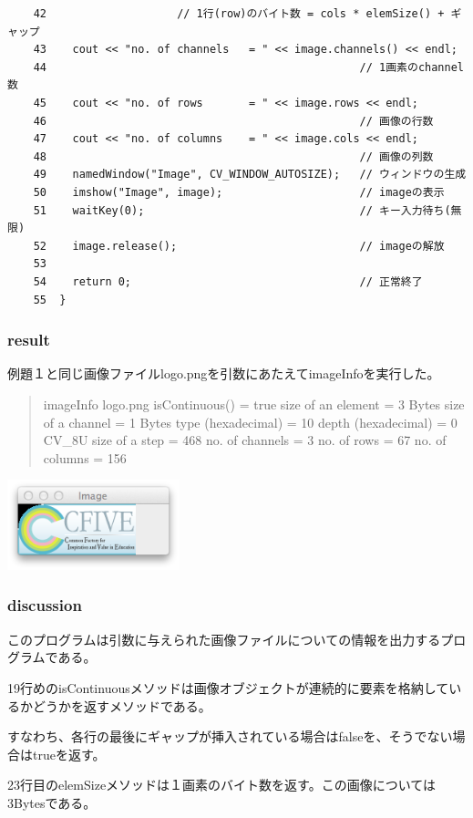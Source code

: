 \documentclass{jsarticle}
\begin{document}
\begin{verbatim}
    42	                  // 1行(row)のバイト数 = cols * elemSize() + ギャップ
    43	  cout << "no. of channels   = " << image.channels() << endl;
    44	                                              // 1画素のchannel数
    45	  cout << "no. of rows       = " << image.rows << endl;
    46	                                              // 画像の行数
    47	  cout << "no. of columns    = " << image.cols << endl;
    48	                                              // 画像の列数
    49	  namedWindow("Image", CV_WINDOW_AUTOSIZE);   // ウィンドウの生成
    50	  imshow("Image", image);                     // imageの表示
    51	  waitKey(0);                                 // キー入力待ち(無限)
    52	  image.release();                            // imageの解放
    53	
    54	  return 0;                                   // 正常終了
    55	}
\end{verbatim}

\subsubsection{result}
例題１と同じ画像ファイルlogo.pngを引数にあたえてimageInfoを実行した。  
\begin{quote}
imageInfo logo.png   
isContinuous() = true  
size of an element = 3 Bytes  
size of a channel  = 1 Bytes  
type (hexadecimal) = 10  
depth (hexadecimal) = 0  
 CV\_8U  
size of a step    = 468  
no. of channels   = 3  
no. of rows       = 67  
no. of columns    = 156  
\end{quote}
\includegraphics[width=5cm]{imageinfo.png}

\subsubsection{discussion}
このプログラムは引数に与えられた画像ファイルについての情報を出力するプログラムである。  

19行めのisContinuousメソッドは画像オブジェクトが連続的に要素を格納しているかどうかを返すメソッドである。  

すなわち、各行の最後にギャップが挿入されている場合はfalseを、そうでない場合はtrueを返す。  

23行目のelemSizeメソッドは１画素のバイト数を返す。この画像については3Bytesである。  
\end{document}
